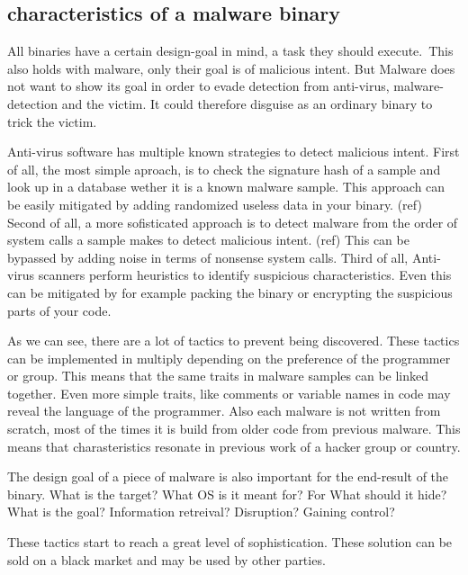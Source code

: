 \subsection{characteristics of a malware binary}
All binaries have a certain design-goal in mind, a task they should execute.\
This also holds with malware, only their goal is of malicious intent.
But Malware does not want to show its goal in order to evade detection from anti-virus, malware-detection and the victim.
It could therefore disguise as an ordinary binary to trick the victim.

Anti-virus software has multiple known strategies to detect malicious intent.
First of all, the most simple aproach, is to check the signature hash of a sample and look up in a database wether it is a known malware sample. 
This approach can be easily mitigated by adding randomized useless data in your binary. (ref)
Second of all, a more sofisticated approach is to detect malware from the order of system calls a sample makes to detect malicious intent. (ref)
This can be bypassed by adding noise in terms of nonsense system calls.
Third of all, Anti-virus scanners perform heuristics to identify suspicious characteristics. Even this can be mitigated by for example packing the binary or encrypting the suspicious parts of your code.

As we can see, there are a lot of tactics to prevent being discovered.
These tactics can be implemented in multiply depending on the preference of the programmer or group. This means that the same traits in malware samples can be linked together. 
Even more simple traits, like comments or variable names in code may reveal the language of the programmer. Also each malware is not written from scratch, most of the times it is build from older code from previous malware. This means that charasteristics resonate in previous work of a hacker group or country.

The design goal of a piece of malware is also important for the end-result of the binary. What is the target? What OS is it meant for? For What should it hide?
What is the goal? Information retreival? Disruption? Gaining control?

These tactics start to reach a great level of sophistication. These solution can be sold on a black market and may be used by other parties.
